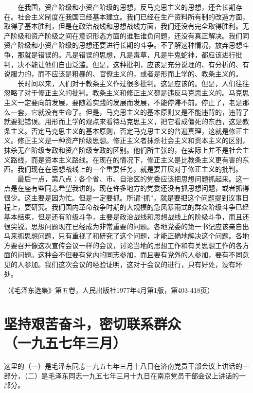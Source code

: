 \documentclass[cn,11pt,chinese]{elegantbook}
\def\myformat#1{\hfil\hfil #1}
\begin{document}
　　在我国，资产阶级和小资产阶级的思想，反马克思主义的思想，还会长期存在。社会主义制度在我国已经基本建立。我们已经在生产资料所有制的改造方面，取得了基本胜利，但是在政治战线和思想战线方面，我们还没有完全取得胜利。无产阶级和资产阶级之间在意识形态方面的谁胜谁负问题，还没有真正解决。我们同资产阶级和小资产阶级的思想还要进行长期的斗争。不了解这种情况，放弃思想斗争，那就是错误的。凡是错误的思想，凡是毒草，凡是牛鬼蛇神，都应该进行批判，决不能让他们自由泛滥。但是，这种批判，应该是充分说理的、有分析的、有说服力的，而不应该是粗暴的、官僚主义的，或者是形而上学的、教条主义的。\\
　　长时间以来，人们对于教条主义作过很多批判。这是应该的。但是，人们往往忽略了对于修正主义的批判。教条主义和修正主义都是违反马克思主义的。马克思主义一定要向前发展，要随着实践的发展而发展，不能停滞不前。停止了，老是那么一套，它就没有生命了。但是，马克思主义的基本原则又是不能违背的，违背了就要犯错误。用形而上学的观点来看待马克思主义，把它看成僵死的东西，这是教条主义。否定马克思主义的基本原则，否定马克思主义的普遍真理，这就是修正主义。修正主义是一种资产阶级思想。修正主义者抹杀社会主义和资本主义的区别，抹杀无产阶级专政和资产阶级专政的区别。他们所主张的，在实际上并不是社会主义路线，而是资本主义路线。在现在的情况下，修正主义是比教条主义更有害的东西。我们现在在思想战线上的一个重要任务，就是要开展对于修正主义的批判。\\
　　最后一点，第八点：各个省、市、自治区的党委应该把思想问题抓起来。这一点是在座有些同志希望我讲的。现在许多地方的党委还没有抓思想问题，或者抓得很少。这主要是因为忙。但是一定要抓。所谓“抓”，就是要把这个问题提到议事日程上，要研究。我们国内革命战争时期的大规模的急风暴雨式的群众阶级斗争已经基本结束，但是还有阶级斗争，主要是政治战线和思想战线上的阶级斗争，而且还很尖锐。思想问题现在已经成为非常重要的问题。各地党委的第一书记应该亲自出马来抓思想问题，只有重视了和研究了这个问题，才能正确地解决这个问题。各地方要召开像这次宣传会议一样的会议，讨论当地的思想工作和有关思想工作的各方面的问题。这种会不但要有党内的同志参加，而且要有党外的人参加，要有不同意见的人参加。我们这次会议的经验证明，这对于会议的进行，只有好处，没有坏处。\\
\begin{flushright}（《毛泽东选集》第五卷，人民出版社1977年4月第1版，第403-418页）\end{flushright}
\newpage\section*{\myformat{坚持艰苦奋斗，密切联系群众}\\\myformat{（一九五七年三月）}}
\begin{introduction}\item  这里的（一）是毛泽东同志一九五七年三月十八日在济南党员干部会议上讲话的一部分，（二）是毛泽东同志一九五七年三月十九日在南京党员干部会议上讲话的一部分。\end{introduction}
\end{document}
